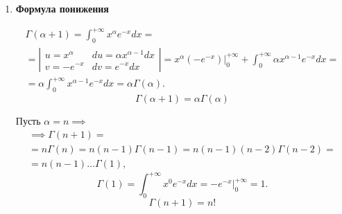 \begin{enumerate}
\begin{proof}
              Так как $ \int_{0}^{+\infty}x^{\alpha_0 - \epsilon -1}\cdot x^{\frac{\alpha_0 - \epsilon - 1}{x}}dx $ сходится по признаку Вейерштрасса, то $ \int_{0}^{+\infty}x^{\alpha-1}e^{-x}\ln x dx $ сходится равномерно на $ [\alpha_0 - \epsilon;\alpha_0+\epsilon] $.

              Далее, $ \forall\alpha \in [\alpha_0 - \epsilon;\alpha_0 + \epsilon] $
              \[
                  e^{-x}x^{\alpha-1}\ln x \leqslant e^{-x}x^{\alpha_0+\epsilon-1}\ln x.
              \]

              Так как $ \int_{0}^{+\infty}e^{-x}x^{\alpha_0+\epsilon-1}\ln x dx $ сходится, то и сходится равномерно на $ [\alpha_0-\epsilon;\alpha_0+\epsilon] $ и $ \int_{0}^{+\infty}e^{-x}x^{\alpha-1}\ln x dx $.

              Аналогичное доказательство имеет место быть и для $ \Gamma^{(n)}(\alpha) $.
          \end{proof}

    \item \textbf{Формула понижения}

          \begin{note}
              \begin{multline*}
                  \Gamma(\alpha+1) = \int_{0}^{+\infty}x^\alpha e^{-x}dx = \\
                  = \left|\begin{array}{ll}
                      u = x^\alpha & du = \alpha x^{\alpha-1}dx \\
                      v = -e^{-x}  & dv = e^{-x}dx
                  \end{array}\right| = x^\alpha(-e^{-x})\Big|_0^{+\infty} + \int_{0}^{+\infty}\alpha x^{\alpha-1}e^{-x}dx = \\
                  = \alpha \int_{0}^{+\infty}x^{\alpha-1}e^{-x}dx = \alpha \Gamma(\alpha).
              \end{multline*}
              \[
                  \boxed{\Gamma(\alpha+1) = \alpha\Gamma(\alpha)}
              \]

              Пусть $ \alpha=n \implies $
              \begin{multline*}
                  \implies \Gamma(n+1) = \\
                  = n\Gamma(n) = n(n-1)\Gamma(n-1) = n(n-1)(n-2)\Gamma(n-2) = \\
                  = n(n-1)\ldots\Gamma(1),
              \end{multline*}
              \[
                  \Gamma(1) = \int_{0}^{+\infty}x^0 e^{-x}dx = -e^{-x}\Big|_0^{+\infty} = 1.
              \]
              \[
                  \boxed{\Gamma(n+1) = n!}
              \]
          \end{note}
\end{enumerate}